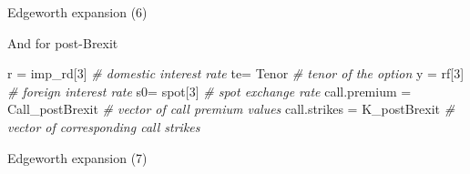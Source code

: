 \documentclass[ignorenonframetext,aspectratio=169]{beamer}
\newenvironment{Shaded}{}{}
\newcommand{\KeywordTok}[1]{\textcolor[rgb]{0.00,0.44,0.13}{\textbf{#1}}}
\newcommand{\DataTypeTok}[1]{\textcolor[rgb]{0.56,0.13,0.00}{#1}}
\newcommand{\DecValTok}[1]{\textcolor[rgb]{0.25,0.63,0.44}{#1}}
\newcommand{\StringTok}[1]{\textcolor[rgb]{0.25,0.44,0.63}{#1}}
\newcommand{\CommentTok}[1]{\textcolor[rgb]{0.38,0.63,0.69}{\textit{#1}}}
\newcommand{\OtherTok}[1]{\textcolor[rgb]{0.00,0.44,0.13}{#1}}
\newcommand{\OperatorTok}[1]{\textcolor[rgb]{0.40,0.40,0.40}{#1}}
\newcommand{\NormalTok}[1]{#1}
\begin{document}
\begin{frame}[fragile]{Edgeworth expansion (6)}

And for post-Brexit

\begin{Shaded}
\begin{Highlighting}[]
\NormalTok{r =}\StringTok{ }\NormalTok{imp_rd[}\DecValTok{3}\NormalTok{]                    }\CommentTok{# domestic interest rate}
\NormalTok{te=}\StringTok{ }\NormalTok{Tenor                        }\CommentTok{# tenor of the option}
\NormalTok{y =}\StringTok{ }\NormalTok{rf[}\DecValTok{3}\NormalTok{]                        }\CommentTok{# foreign interest rate}
\NormalTok{s0=}\StringTok{ }\NormalTok{spot[}\DecValTok{3}\NormalTok{]                      }\CommentTok{# spot exchange rate}
\NormalTok{call.premium =}\StringTok{ }\NormalTok{Call_postBrexit   }\CommentTok{# vector of call premium values}
\NormalTok{call.strikes =}\StringTok{ }\NormalTok{K_postBrexit      }\CommentTok{# vector of corresponding call strikes}
\end{Highlighting}
\end{Shaded}

\end{frame}

\begin{frame}[fragile]{Edgeworth expansion (7)}

\begin{Shaded}
\end{Shaded}

\end{frame}
\end{document}
